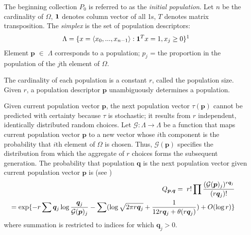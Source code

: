 The beginning collection $P_0$ is referred to as the {\em initial population}. Let $n$ be the cardinality 
of $\Omega$, ${\bf1}$ denotes column vector of all 1s, $T$ denotes matrix transposition. 
The {\em simplex} is the set of population descriptors:
\[
\Lambda = \{x = \langle x_0,...,x_{n-1} \rangle: {\bf1}^T x=1, x_j \geq 0 \} \text{\footnotemark\label{fnm:1}}
\]
Element $\bm{p}$ $\in$ $\Lambda$ corresponds to a population;
$p_j$ = the proportion in the population of the $j$th element of $\Omega$.

The cardinality of each population is a constant $r$, called the population size. 
Given $r$, a population descriptor $\bm{p}$ unambiguously determines a population.

Given current population vector $\bm{p}$, the next population vector $\tau(\bm{p})$ cannot 
be predicted with certainty because $\tau$ is stochastic; it results from $r$ independent, identically distributed random choices. 
Let $\mathcal{G}:\Lambda \rightarrow \Lambda$ be a function that maps 
current population vector $\bm{p}$ to a new vector whose $i$th component 
is the probability that $i$th element of $\Omega$ is chosen. Thus, $\mathcal{G}(\bm{p})$ 
specifies the distribution from which the aggregate 
of $r$ choices forms the subsequent generation. The probability that population $\bm{q}$ is 
the next population vector given current population vector $\bm{p}$ is (see \cite{Vose1999}) 
\begin{eqnarray}
\label{Qmat}
& & \mbox{} \hspace{-0.6in} Q_{\bm{p},\bm{q}} =\; r! \prod \frac{(\mathcal{G}(\bm{p})_j)^{r\bm{q}_j}}{(r\bm{q}_j)!} \\
& & \mbox{} \hspace{-0.3in} = \exp\{-r \sum \bm{q}_j \log \frac{\bm{q}_j}{\mathcal{G}(\bm{p})_j} - \sum (\log \sqrt{2 \pi r\bm{q}_j}  + \frac{1}{12r\bm{q}_j + \theta (r\bm{q}_j)}) + O(\log r)\}
\end{eqnarray}
where summation is restricted to indices for which $\bm{q}_j > 0$.

